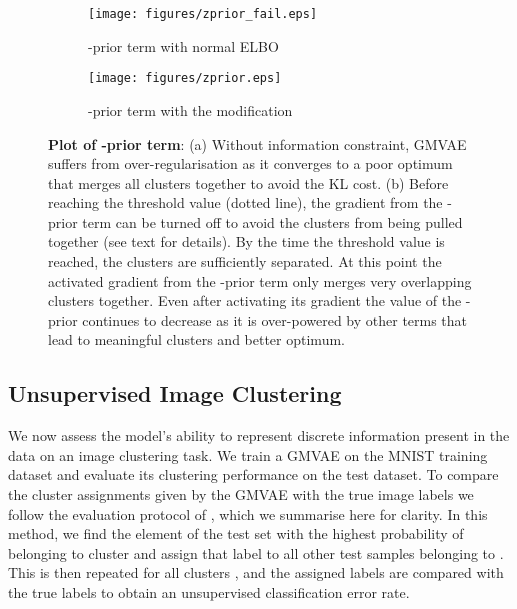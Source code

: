\documentclass{article} \usepackage{iclr2017_conference,times}
\begin{document}
\begin{figure}[h]
\centering
\begin{subfigure}{.5\textwidth}
		\centering
		\texttt{[image: figures/zprior\_fail.eps]}
		\caption{-prior term with normal ELBO}
        \label{fig:zpriorfail}
	\end{subfigure}\begin{subfigure}{.5\textwidth}
		\centering
		\texttt{[image: figures/zprior.eps]}
		\caption{-prior term with the modification}
        \label{fig:zprior}
	\end{subfigure}

\caption{\textbf{Plot of -prior term}: (a) Without information constraint, GMVAE suffers from over-regularisation as it converges to a poor optimum that merges all clusters together to avoid the KL cost. (b) Before reaching the threshold value (dotted line), the gradient from the -prior term can be turned off to avoid the clusters from being pulled together (see text for details). By the time the threshold value is reached, the clusters are sufficiently separated. At this point the activated gradient from the -prior term only merges very overlapping clusters together. Even after activating its gradient the value of the -prior continues to decrease as it is over-powered by other terms that lead to meaningful clusters and better optimum.}
\label{fig:zplot}
\end{figure}

\subsection{Unsupervised Image Clustering}

We now assess the model's ability to represent discrete information present in the data on an image clustering task. We train a GMVAE on the MNIST training dataset and evaluate its clustering performance on the test dataset. To compare the cluster assignments given by the GMVAE with the true image labels we follow the evaluation protocol of \cite{makhzani2015adversarial}, which we summarise here for clarity. In this method, we find the element of the test set with the highest probability of belonging to cluster  and assign that label to all other test samples belonging to . This is then repeated for all clusters , and the assigned labels are compared with the true labels to obtain an unsupervised classification error rate.
\end{document}
